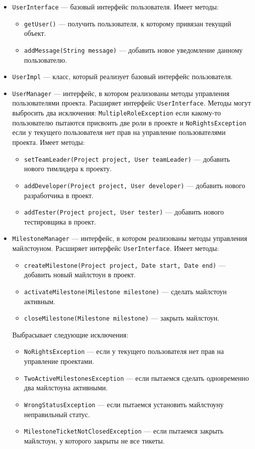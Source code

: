 	\begin{itemize}
		\item \texttt{UserInterface} --- базовый интерфейс пользователя. Имеет методы:
		\begin{itemize}
			\item \texttt{getUser()} --- получить пользователя, к которому привязан текущий объект.
			\item \texttt{addMessage(String message)} --- добавить новое уведомление данному пользователю.
		\end{itemize}
		
		\item \texttt{UserImpl} --- класс, который реализует базовый интерфейс пользователя.
		
		\item \texttt{UserManager} --- интерфейс, в котором реализованы методы управления пользователями проекта. Расширяет интерфейс \texttt{UserInterface}. Методы могут выбросить два исключения: \texttt{MultipleRoleException} если какому-то пользователю пытаются присвоить две роли в проекте и \texttt{NoRightsException} если у текущего пользователя нет прав на управление пользователями проекта. Имеет методы:
		\begin{itemize}
			\item \texttt{setTeamLeader(Project project, User teamLeader)} --- добавить нового тимлидера к проекту.
			\item \texttt{addDeveloper(Project project, User developer)} --- добавить нового разработчика в проект.
			\item \texttt{addTester(Project project, User tester)} --- добавить нового тестировщика в проект.	
		\end{itemize}
		
		\item \texttt{MilestoneManager} --- интерфейс, в котором реализованы методы управления майлстоуном. Расширяет интерфейс \texttt{UserInterface}. Имеет методы:
		\begin{itemize}
			\item \texttt{createMilestone(Project project, Date start, Date end)} --- добавить новый майлстоун в проект.
			\item \texttt{activateMilestone(Milestone milestone)} --- сделать майлстоун активным.
			\item \texttt{closeMilestone(Milestone milestone)} --- закрыть майлстоун.	
		\end{itemize}
		
		Выбрасывает следующие исключения:
		\begin{itemize}
			\item \texttt{NoRightsException} --- если у текущего пользователя нет прав на управление проектами.
			\item \texttt{TwoActiveMilestonesException} --- если пытаемся сделать одновременно два майлстоуна активными.
			\item \texttt{WrongStatusException} --- если пытаемся установить майлстоуну неправильный статус.	
			\item \texttt{MilestoneTicketNotClosedException} --- если пытаемся закрыть майлстоун, у которого закрыты не все тикеты.	
		\end{itemize}
		

\end{itemize}
